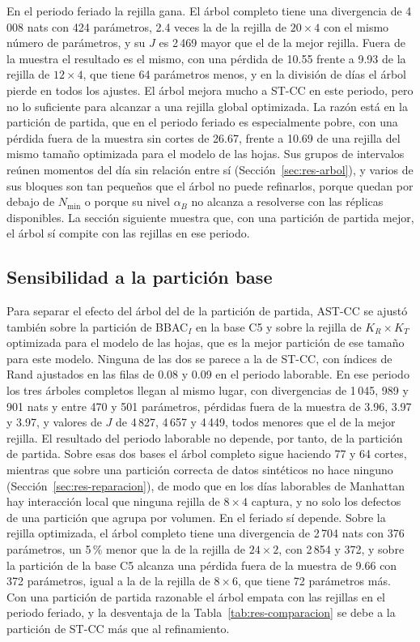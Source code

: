 En el periodo feriado la rejilla gana. El árbol completo tiene una divergencia
de 4\,008 nats con 424 parámetros, 2.4 veces la de la rejilla de $20 \times 4$
con el mismo número de parámetros, y su $J$ es 2\,469 mayor que el de la mejor
rejilla. Fuera de la muestra el resultado es el mismo, con una pérdida de 10.55
frente a 9.93 de la rejilla de $12 \times 4$, que tiene 64 parámetros menos, y en
la división de días el árbol pierde en todos los ajustes. El árbol mejora mucho a
ST-CC en este periodo, pero no lo suficiente para alcanzar a una rejilla global
optimizada. La razón está en la partición de partida, que en el periodo feriado es
especialmente pobre, con una pérdida fuera de la muestra sin cortes de 26.67,
frente a 10.69 de una rejilla del mismo tamaño optimizada para el modelo de las
hojas. Sus grupos de intervalos reúnen momentos del día sin relación entre sí
(Sección~\ref{sec:res-arbol}), y varios de sus bloques son tan pequeños que el
árbol no puede refinarlos, porque quedan por debajo de $N_{\min}$ o porque su
nivel $\alpha_B$ no alcanza a resolverse con las réplicas disponibles. La
sección siguiente muestra que, con una partición de partida mejor, el árbol sí
compite con las rejillas en ese periodo.

\subsection{Sensibilidad a la partición base}\label{sec:res-sensibilidad}

Para separar el efecto del árbol del de la partición de partida, AST-CC se ajustó
también sobre la partición de BBAC$_I$ en la base C5 y sobre la rejilla de
$K_R \times K_T$ optimizada para el modelo de las hojas, que es la mejor partición
de ese tamaño para este modelo. Ninguna de las dos se parece a la de ST-CC, con
índices de Rand ajustados en las filas de 0.08 y 0.09 en el periodo laborable. En
ese periodo los tres árboles completos llegan al mismo lugar, con divergencias de
1\,045, 989 y 901 nats y entre 470 y 501 parámetros, pérdidas fuera de la muestra
de 3.96, 3.97 y 3.97, y valores de $J$ de 4\,827, 4\,657 y 4\,449, todos menores
que el de la mejor rejilla. El resultado del periodo laborable no depende, por
tanto, de la partición de partida. Sobre esas dos bases el árbol completo sigue
haciendo 77 y 64 cortes, mientras que sobre una partición correcta de datos
sintéticos no hace ninguno (Sección~\ref{sec:res-reparacion}), de modo que en los
días laborables de Manhattan hay interacción local que ninguna rejilla de
$8 \times 4$ captura, y no solo los defectos de una partición que agrupa por
volumen. En el feriado sí depende. Sobre la rejilla
optimizada, el árbol completo tiene una divergencia de 2\,704 nats con 376
parámetros, un 5\,\% menor que la de la rejilla de $24 \times 2$, con 2\,854 y 372,
y sobre la partición de la base C5 alcanza una pérdida fuera de la muestra de 9.66
con 372 parámetros, igual a la de la rejilla de $8 \times 6$, que tiene 72
parámetros más. Con una partición de partida razonable el árbol empata con las
rejillas en el periodo feriado, y la desventaja de la
Tabla~\ref{tab:res-comparacion} se debe a la partición de ST-CC más que al
refinamiento.


